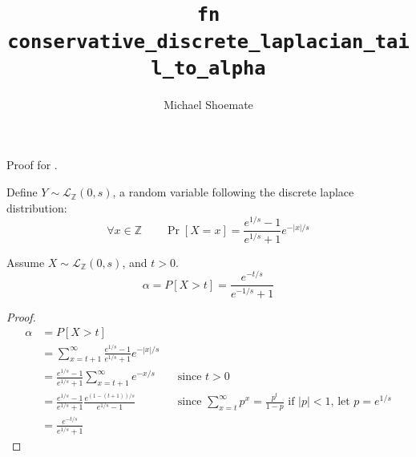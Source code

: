 \documentclass{article}
\title{\texttt{fn conservative\_discrete\_laplacian\_tail\_to\_alpha}}
\author{Michael Shoemate}
\begin{document}
\maketitle

\contrib

Proof for .

\begin{definition}
    Define $Y \sim \mathcal{L}_\mathbb{Z}(0, s)$, a random variable following the discrete laplace distribution:
    \begin{equation}
        \forall x \in \mathbb{Z} \qquad \Pr[X = x] = \frac{e^{1/s} - 1}{e^{1/s} + 1} e^{-|x|/s}
    \end{equation}
\end{definition}

\begin{theorem}
    Assume $X \sim \mathcal{L}_\mathbb{Z}(0, s)$, and $t > 0$.
    \begin{equation}
        \alpha = P[X > t] = \frac{e^{-t/s}}{e^{-1/s} + 1}
    \end{equation}
\end{theorem}

\begin{proof}
    \begin{align*}
        \alpha &= P[X > t] \\
        &= \sum_{x=t + 1}^{\infty} \frac{e^{1/s} - 1}{e^{1/s} + 1} e^{-|x|/s} \\
        &= \frac{e^{1/s} - 1}{e^{1/s} + 1} \sum_{x=t + 1}^{\infty} e^{-x/s}
            && \text{since } t > 0 \\
        &= \frac{e^{1/s} - 1}{e^{1/s} + 1} \frac{e^{(1-(t + 1))/s}}{e^{1/s} - 1}
            && \text{since } \sum_{x=t}^\infty p^x = \frac{p^t}{1 - p} \text{ if } |p| < 1 \text{, let } p = e^{1/s}\\
        &= \frac{e^{-t/s}}{e^{1/s} + 1}
    \end{align*}

\end{proof}
\end{document}
